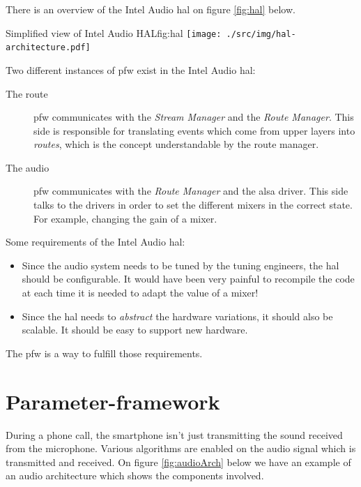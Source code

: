There is an overview of the Intel Audio \gls{hal} on figure \ref{fig:hal} below.
\begin{figureGraphics}{Simplified view of Intel Audio HAL}{fig:hal}
    \texttt{[image: ./src/img/hal-architecture.pdf]}
\end{figureGraphics}
Two different instances of \gls{pfw} exist in the Intel Audio \gls{hal}:
\begin{description}
    \item[The route] \gls{pfw} communicates with the \emph{Stream Manager} and the \emph{Route Manager}.
        This side is responsible for translating events which come from upper layers into \emph{routes}, which
        is the concept understandable by the route manager.
    \item[The audio] \gls{pfw} communicates with the \emph{Route Manager} and the \gls{alsa} driver.
        This side talks to the drivers in order to set the different mixers in the correct state. For example,
        changing the gain of a mixer.
\end{description}

Some requirements of the Intel Audio \gls{hal}:
\begin{itemize}
    \item Since the audio system needs to be tuned by the tuning engineers, the \gls{hal} should be configurable.
        It would have been very painful to recompile the code at each time it is needed to adapt the value of a mixer!
    \item Since the \gls{hal} needs to \emph{abstract} the hardware variations, it should also be scalable. It should be
        easy to support new hardware.
\end{itemize}

The \gls{pfw} is a way to fulfill those requirements.

\section{Parameter-framework}
\label{sec:parameter-framework}
During a phone call, the smartphone isn't just transmitting the sound received from the microphone. Various algorithms are
enabled on the audio signal which is transmitted and received.
On figure \ref{fig:audioArch} below we have an example of an audio architecture which shows the components involved.

